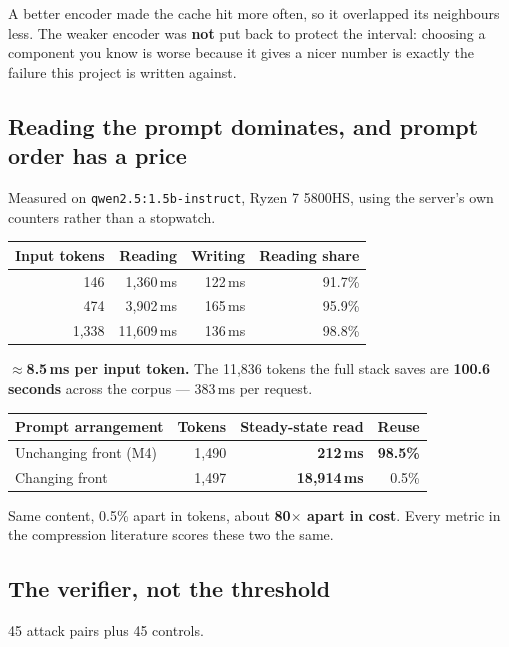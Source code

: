 \documentclass[11pt,a4paper]{article}
\begin{document}
A better encoder made the cache hit more often, so it overlapped its neighbours less.
The weaker encoder was \textbf{not} put back to protect the interval: choosing a
component you know is worse because it gives a nicer number is exactly the failure this
project is written against.

\subsection{Reading the prompt dominates, and prompt order has a price}
Measured on \texttt{qwen2.5:1.5b-instruct}, Ryzen 7 5800HS, using the server's own
counters rather than a stopwatch.

\begin{center}
\begin{tabular}{@{}rrrr@{}}
\toprule
\textbf{Input tokens} & \textbf{Reading} & \textbf{Writing} & \textbf{Reading share} \\
\midrule
146 & 1{,}360\,ms & 122\,ms & 91.7\% \\
474 & 3{,}902\,ms & 165\,ms & 95.9\% \\
1{,}338 & 11{,}609\,ms & 136\,ms & 98.8\% \\
\bottomrule
\end{tabular}
\end{center}

\textbf{$\approx$8.5\,ms per input token.} The 11{,}836 tokens the full stack saves are
\textbf{100.6 seconds} across the corpus --- 383\,ms per request.

\begin{center}
\begin{tabular}{@{}lrrr@{}}
\toprule
\textbf{Prompt arrangement} & \textbf{Tokens} & \textbf{Steady-state read} & \textbf{Reuse} \\
\midrule
Unchanging front (M4) & 1{,}490 & \textbf{212\,ms} & \textbf{98.5\%} \\
Changing front & 1{,}497 & \textbf{18{,}914\,ms} & 0.5\% \\
\bottomrule
\end{tabular}
\end{center}

Same content, 0.5\% apart in tokens, about \textbf{80$\times$ apart in cost}. Every
metric in the compression literature scores these two the same.

\subsection{The verifier, not the threshold}
45 attack pairs plus 45 controls.
\end{document}

